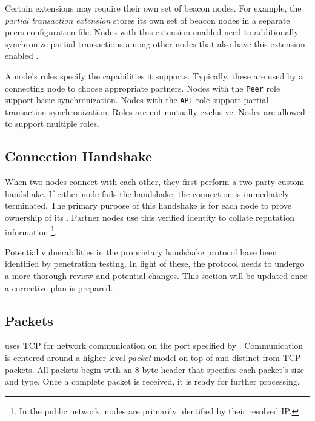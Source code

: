 Certain extensions may require their own set of beacon nodes.
For example, the \emph{partial transaction extension} stores its own set of beacon nodes in a separate peers configuration file.
Nodes with this extension enabled need to additionally synchronize partial transactions among other nodes that also have this extension enabled  .

A node's roles specify the capabilities it supports.
Typically, these are used by a connecting node to choose appropriate partners.
Nodes with the \texttt{Peer} role support basic synchronization.
Nodes with the \texttt{API} role support partial transaction synchronization.
Roles are not mutually exclusive.
Nodes are allowed to support multiple roles.

\subsection{Connection Handshake}

When two \codenamespace nodes connect with each other, they first perform a two-party custom handshake.
If either node fails the handshake, the connection is immediately terminated.
The primary purpose of this handshake is for each node to prove ownership of its .
Partner nodes use this verified identity to collate reputation  information
\footnote{In the public network, nodes are primarily identified by their resolved IP.}.

Potential vulnerabilities in the \codenamespace proprietary handshake protocol have been identified by penetration testing.
In light of these, the protocol needs to undergo a more thorough review and potential changes.
This section will be updated once a corrective plan is prepared.

\subsection{Packets}

\codenamespace uses TCP for network communication on the port specified by .
Communication is centered around a higher level \emph{packet} model on top of and distinct from TCP packets.
All packets begin with an 8-byte header that specifies each packet's size and type.
Once a complete packet is received, it is ready for further processing.

\begin{figure}[H]
\end{figure}


